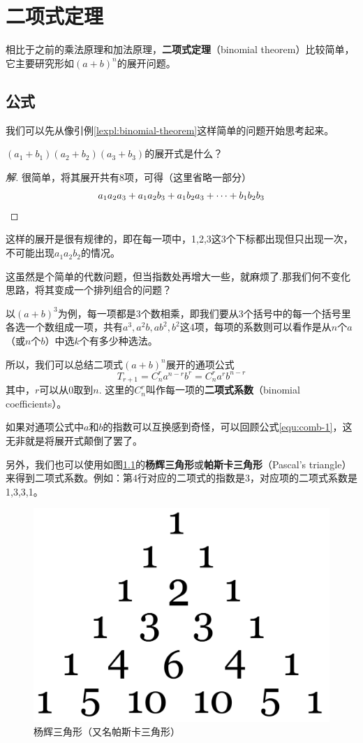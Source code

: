 \chapter{二项式定理}
相比于之前的乘法原理和加法原理，\textbf{二项式定理}（binomial theorem）比较简单，它主要研究形如$(a+b)^n$的展开问题。

\section{公式}
我们可以先从像引例\ref{lexpl:binomial-theorem}这样简单的问题开始思考起来。

\begin{lexample}\label{lexpl:binomial-theorem}
	$(a_1+b_1)(a_2+b_2)(a_3+b_3)$的展开式是什么？
\end{lexample}

\begin{proof}[解]
	很简单，将其展开共有8项，可得（这里省略一部分）\[a_1a_2a_3+a_1a_2b_3+a_1b_2a_3+\cdots+b_1b_2b_3\qedhere\]
\end{proof}

这样的展开是很有规律的，即在每一项中，1,2,3这3个下标都出现但只出现一次，不可能出现$a_1a_2b_2$的情况。

这虽然是个简单的代数问题，但当指数处再增大一些，就麻烦了.那我们何不变化思路，将其变成一个排列组合的问题？

以$(a+b)^3$为例，每一项都是3个数相乘，即我们要从3个括号中的每一个括号里各选一个数组成一项，共有$a^3,a^2b,ab^2,b^2$这4项，每项的系数则可以看作是从$n$个$a$（或$n$个$b$）中选$k$个有多少种选法。

所以，我们可以总结二项式$(a+b)^n$展开的通项公式\[T_{r+1}=C_n^ra^{n-r}b^r=C_n^ra^rb^{n-r}\]其中，$r$可以从0取到$n$. 这里的$C_n^r$叫作每一项的\textbf{二项式系数}（binomial coefficients）。

如果对通项公式中$a$和$b$的指数可以互换感到奇怪，可以回顾公式\eqref{equ:comb-1}，这无非就是将展开式颠倒了罢了。

另外，我们也可以使用如图\ref{fig:pascals-triangle}的\textbf{杨辉三角形}或\textbf{帕斯卡三角形}（Pascal's triangle）来得到二项式系数。例如：第4行对应的二项式的指数是3，对应项的二项式系数是1,3,3,1。

\begin{figure}[htb]
	\centering
	\includegraphics[width=0.4\linewidth]{src/images/pascals-triangle.png}
	\caption{杨辉三角形（又名帕斯卡三角形）}
	\label{fig:pascals-triangle}
\end{figure}

